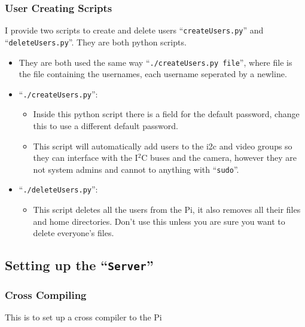 \documentclass{article}
\begin{document}
\subsubsection{User Creating Scripts}
I provide two scripts to create and delete users ``{\tt createUsers.py}'' and ``{\tt deleteUsers.py}''. They are both python scripts.
\begin{itemize}
    \item They are both used the same way ``{\tt ./createUsers.py file}'', where file is the file containing the usernames, each username seperated by a newline.
    \item ``{\tt ./createUsers.py}'':

    \begin{itemize}
        \item Inside this python script there is a field for the default password, change this to use a different default password.
        \item This script will automatically add users to the i2c and video groups so they can interface with the I$^2$C buses and the camera, however they are not system admins and cannot to anything with ``{\tt sudo}''.
    \end{itemize}

    \item ``{\tt ./deleteUsers.py}'':

    \begin{itemize}
        \item This script deletes all the users from the Pi, it also removes all their files and home directories. Don't use this unless you are sure you want to delete everyone's files.
    \end{itemize}
\end{itemize}

\subsection{Setting up the ``{\tt Server}''}
\subsubsection{Cross Compiling}
This is to set up a cross compiler to the Pi
\end{document}
